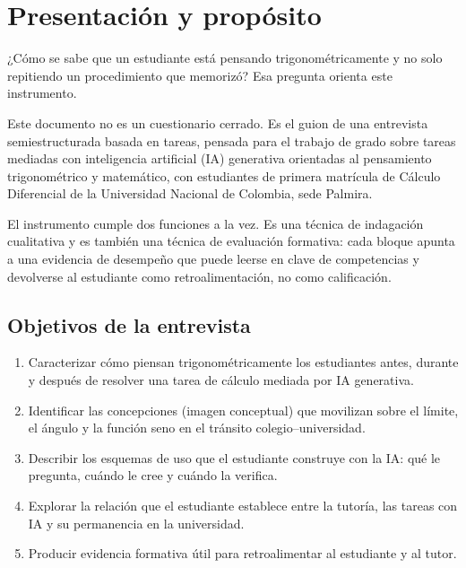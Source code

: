 \documentclass[11pt,letterpaper]{article}
\newcounter{preg}
\begin{document}
\tableofcontents
\newpage

\section{Presentación y propósito}

¿Cómo se sabe que un estudiante está pensando trigonométricamente y no solo repitiendo un procedimiento que memorizó? Esa pregunta orienta este instrumento.

Este documento no es un cuestionario cerrado. Es el guion de una entrevista semiestructurada basada en tareas, pensada para el trabajo de grado sobre tareas mediadas con inteligencia artificial (IA) generativa orientadas al pensamiento trigonométrico y matemático, con estudiantes de primera matrícula de Cálculo Diferencial de la Universidad Nacional de Colombia, sede Palmira.

El instrumento cumple dos funciones a la vez. Es una técnica de indagación cualitativa y es también una técnica de evaluación formativa: cada bloque apunta a una evidencia de desempeño que puede leerse en clave de competencias y devolverse al estudiante como retroalimentación, no como calificación.

\subsection*{Objetivos de la entrevista}
\begin{enumerate}[label=\textbf{O\arabic*.}]
  \item Caracterizar cómo piensan trigonométricamente los estudiantes antes, durante y después de resolver una tarea de cálculo mediada por IA generativa.
  \item Identificar las concepciones (imagen conceptual) que movilizan sobre el límite, el ángulo y la función seno en el tránsito colegio--universidad.
  \item Describir los esquemas de uso que el estudiante construye con la IA: qué le pregunta, cuándo le cree y cuándo la verifica.
  \item Explorar la relación que el estudiante establece entre la tutoría, las tareas con IA y su permanencia en la universidad.
  \item Producir evidencia formativa útil para retroalimentar al estudiante y al tutor.
\end{enumerate}
\end{document}
